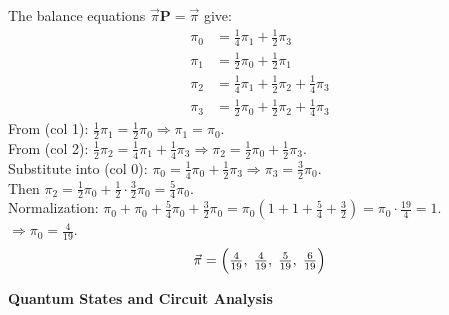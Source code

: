 \documentclass[12pt,a4paper]{exam}
\begin{document}
\begin{questions}
\begin{parts}
\begin{solution}
The balance equations $\vec{\pi}\mathbf{P} = \vec{\pi}$ give:
\begin{align}
\pi_0 &= \tfrac{1}{4}\pi_1 + \tfrac{1}{2}\pi_3 \tag{col 0}\\
\pi_1 &= \tfrac{1}{2}\pi_0 + \tfrac{1}{2}\pi_1 \tag{col 1}\\
\pi_2 &= \tfrac{1}{4}\pi_1 + \tfrac{1}{2}\pi_2 + \tfrac{1}{4}\pi_3 \tag{col 2}\\
\pi_3 &= \tfrac{1}{2}\pi_0 + \tfrac{1}{2}\pi_2 + \tfrac{1}{4}\pi_3 \tag{col 3}
\end{align}
From (col 1): $\tfrac12\pi_1 = \tfrac12\pi_0 \Rightarrow \pi_1 = \pi_0$.\\
From (col 2): $\tfrac12\pi_2 = \tfrac14\pi_1 + \tfrac14\pi_3 \Rightarrow \pi_2 = \tfrac12\pi_0 + \tfrac12\pi_3$.\\
Substitute into (col 0): $\pi_0 = \tfrac14\pi_0 + \tfrac12\pi_3 \Rightarrow \pi_3 = \tfrac32\pi_0$.\\
Then $\pi_2 = \tfrac12\pi_0 + \tfrac12\cdot\tfrac32\pi_0 = \tfrac54\pi_0$.\\
Normalization: $\pi_0 + \pi_0 + \tfrac54\pi_0 + \tfrac32\pi_0 = \pi_0(1+1+\tfrac54+\tfrac32) = \pi_0\cdot\tfrac{19}{4} = 1$.\\
$\Rightarrow \pi_0 = \tfrac{4}{19}$.
\[
\vec{\pi} = \Bigl(\tfrac{4}{19},\; \tfrac{4}{19},\; \tfrac{5}{19},\; \tfrac{6}{19}\Bigr)
\]
\end{solution}

\end{parts}

\newpage
\question[20] \textbf{Quantum States and Circuit Analysis}

\end{questions}
\end{document}
